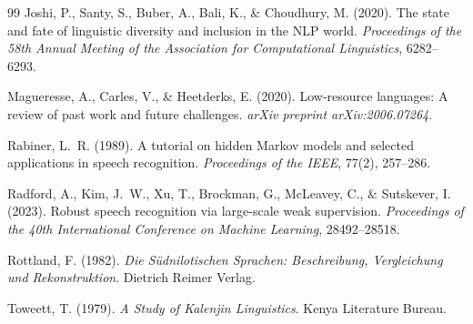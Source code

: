 \documentclass[12pt,a4paper]{article}
\begin{document}
\begin{thebibliography}{99}
Joshi, P., Santy, S., Buber, A., Bali, K., \& Choudhury, M. (2020).
\newblock The state and fate of linguistic diversity and inclusion in the NLP world.
\newblock \textit{Proceedings of the 58th Annual Meeting of the Association for Computational Linguistics}, 6282--6293.

Magueresse, A., Carles, V., \& Heetderks, E. (2020).
\newblock Low-resource languages: A review of past work and future challenges.
\newblock \textit{arXiv preprint arXiv:2006.07264}.

Rabiner, L.~R. (1989).
\newblock A tutorial on hidden Markov models and selected applications in speech recognition.
\newblock \textit{Proceedings of the IEEE}, 77(2), 257--286.

Radford, A., Kim, J.~W., Xu, T., Brockman, G., McLeavey, C., \& Sutskever, I. (2023).
\newblock Robust speech recognition via large-scale weak supervision.
\newblock \textit{Proceedings of the 40th International Conference on Machine Learning}, 28492--28518.

Rottland, F. (1982).
\newblock \textit{Die S{\"u}dnilotischen Sprachen: Beschreibung, Vergleichung und Rekonstruktion}.
\newblock Dietrich Reimer Verlag.

Toweett, T. (1979).
\newblock \textit{A Study of Kalenjin Linguistics}.
\newblock Kenya Literature Bureau.

\end{thebibliography}
\end{document}
